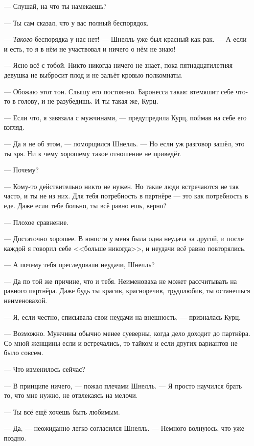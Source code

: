 --- Слушай, на что ты намекаешь?

--- Ты сам сказал, что у вас полный беспорядок.

--- \emph{Такого} беспорядка у нас нет! --- Шнелль уже был красный как рак.
--- А если и есть, то я в нём не участвовал и ничего о нём не знаю!

--- Ясно всё с тобой.
Никто никогда ничего не знает, пока пятнадцатилетняя девушка не выбросит плод и не зальёт кровью полкомнаты.

--- Обожаю этот тон.
Слышу его постоянно.
Баронесса такая: втемяшит себе что-то в голову, и не разубедишь.
И ты такая же, Курц.

--- Если что, я завязала с мужчинами, --- предупредила Курц, поймав на себе его взгляд.

--- Да я не об этом, --- поморщился Шнелль.
--- Но если уж разговор зашёл, это ты зря.
Ни к чему хорошему такое отношение не приведёт.

--- Почему?

--- Кому-то действительно никто не нужен.
Но такие люди встречаются не так часто, и ты не из них.
Для тебя потребность в партнёре --- это как потребность в еде.
Даже если тебе больно, ты всё равно ешь, верно?

--- Плохое сравнение.

--- Достаточно хорошее.
В юности у меня была одна неудача за другой, и после каждой я говорил себе <<больше никогда>>, и неудачи всё равно повторялись.

--- А почему тебя преследовали неудачи, Шнелль?

--- Да по той же причине, что и тебя.
Неименоваха не может рассчитывать на равного партнёра.
Даже будь ты красив, красноречив, трудолюбив, ты останешься неименовахой.

--- Я, если честно, списывала свои неудачи на внешность, --- призналась Курц.

--- Возможно.
Мужчины обычно менее суеверны, когда дело доходит до партнёра.
Со мной женщины если и встречались, то тайком и если других вариантов не было совсем.

--- Что изменилось сейчас?

--- В принципе ничего, --- пожал плечами Шнелль.
--- Я просто научился брать то, что мне нужно, не отвлекаясь на мелочи.

--- Ты всё ещё хочешь быть любимым.

--- Да, --- неожиданно легко согласился Шнелль.
--- Немного волнуюсь, что уже поздно.


